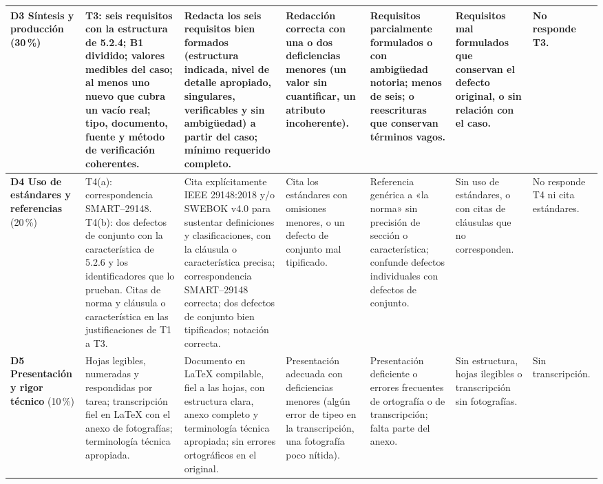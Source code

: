 \documentclass[11pt]{article}
\begin{document}
\begin{landscape}
{\begin{longtable}{|L{2.6cm}|L{4.3cm}|L{3.5cm}|L{3.2cm}|L{3.2cm}|L{3.0cm}|L{1.8cm}|}
				\hline
				\textbf{D3 Síntesis y producción} (30\,\%) & T3: seis requisitos con la estructura de 5.2.4; B1 dividido; valores medibles del caso; al menos uno nuevo que cubra un vacío real; tipo, documento, fuente y método de verificación coherentes. & Redacta los seis requisitos bien formados (estructura indicada, nivel de detalle apropiado, singulares, verificables y sin ambigüedad) a partir del caso; mínimo requerido completo. & Redacción correcta con una o dos deficiencias menores (un valor sin cuantificar, un atributo incoherente). & Requisitos parcialmente formulados o con ambigüedad notoria; menos de seis; o reescrituras que conservan términos vagos. & Requisitos mal formulados que conservan el defecto original, o sin relación con el caso. & No responde T3.\\
				\hline
				\textbf{D4 Uso de estándares y referencias} (20\,\%) & T4(a): correspondencia SMART--29148. T4(b): dos defectos de conjunto con la característica de 5.2.6 y los identificadores que lo prueban. Citas de norma y cláusula o característica en las justificaciones de T1 a T3. & Cita explícitamente IEEE 29148:2018 y/o SWEBOK v4.0 para sustentar definiciones y clasificaciones, con la cláusula o característica precisa; correspondencia SMART--29148 correcta; dos defectos de conjunto bien tipificados; notación correcta. & Cita los estándares con omisiones menores, o un defecto de conjunto mal tipificado. & Referencia genérica a «la norma» sin precisión de sección o característica; confunde defectos individuales con defectos de conjunto. & Sin uso de estándares, o con citas de cláusulas que no corresponden. & No responde T4 ni cita estándares.\\
				\hline
				\textbf{D5 Presentación y rigor técnico} (10\,\%) & Hojas legibles, numeradas y respondidas por tarea; transcripción fiel en \LaTeX{} con el anexo de fotografías; terminología técnica apropiada. & Documento en \LaTeX{} compilable, fiel a las hojas, con estructura clara, anexo completo y terminología técnica apropiada; sin errores ortográficos en el original. & Presentación adecuada con deficiencias menores (algún error de tipeo en la transcripción, una fotografía poco nítida). & Presentación deficiente o errores frecuentes de ortografía o de transcripción; falta parte del anexo. & Sin estructura, hojas ilegibles o transcripción sin fotografías. & Sin transcripción.\\
				\hline
			\end{longtable}
		}
	\end{landscape}
	
\end{document}
